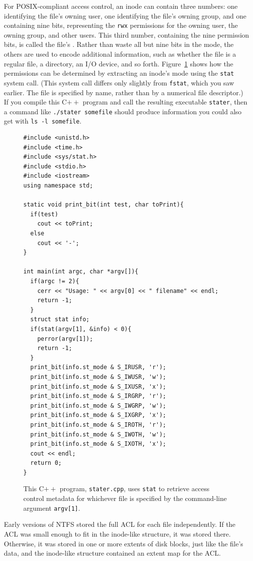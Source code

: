 For POSIX-compliant access control, an inode can contain three
numbers: one identifying the file's owning user, one identifying the
file's owning group, and one containing nine bits, representing the
\verb|rwx| permissions for the owning user, the owning group, and other users.  This third
number, containing the nine permission bits, is called the file's
.  Rather than waste all but nine bits in the mode, the
others are used to encode additional information, such as whether the
file is a regular file, a directory, an I/O device, and so forth.
Figure~\ref{stater-source} shows how the permissions can be determined
by extracting an inode's mode using the {\tt stat} system call.  (This
system call differs only slightly from {\tt fstat}, which you saw
earlier.  The file is specified by name, rather than by a numerical
file descriptor.)  If you compile this C$++$ program and call the
resulting executable {\tt stater}, then a command like
\verb|./stater somefile| should produce information you could also get
with \verb|ls -l somefile|.
\begin{figure}
\begin{verbatim}
#include <unistd.h>
#include <time.h>
#include <sys/stat.h>
#include <stdio.h>
#include <iostream>
using namespace std;

static void print_bit(int test, char toPrint){
  if(test)
    cout << toPrint;
  else
    cout << '-';
}

int main(int argc, char *argv[]){
  if(argc != 2){
    cerr << "Usage: " << argv[0] << " filename" << endl;
    return -1;
  }
  struct stat info;
  if(stat(argv[1], &info) < 0){
    perror(argv[1]);
    return -1;
  }
  print_bit(info.st_mode & S_IRUSR, 'r');
  print_bit(info.st_mode & S_IWUSR, 'w');
  print_bit(info.st_mode & S_IXUSR, 'x');
  print_bit(info.st_mode & S_IRGRP, 'r');
  print_bit(info.st_mode & S_IWGRP, 'w');
  print_bit(info.st_mode & S_IXGRP, 'x');
  print_bit(info.st_mode & S_IROTH, 'r');
  print_bit(info.st_mode & S_IWOTH, 'w');
  print_bit(info.st_mode & S_IXOTH, 'x');
  cout << endl;
  return 0;
}
\end{verbatim}
\caption{This C$++$ program, {\tt stater.cpp}, uses {\tt stat} to
  retrieve access control metadata for whichever file is specified by
  the command-line argument {\tt argv[1]}.}
\label{stater-source}
\end{figure}

Early versions of NTFS stored the full ACL for each file
independently.  If the ACL was small enough to fit in the inode-like
structure, it was stored there.  Otherwise, it was stored in one or
more extents of disk blocks, just like the file's data, and the
inode-like structure contained an extent map for the ACL.

